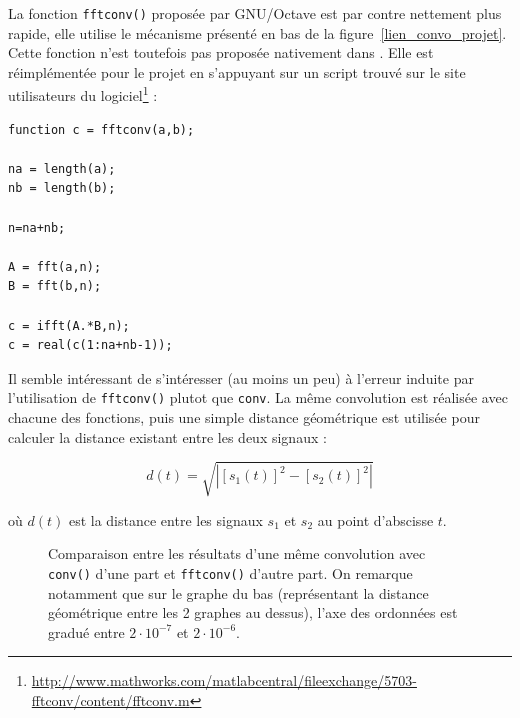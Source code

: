 La fonction \texttt{fftconv()} proposée par GNU/Octave est par contre nettement plus rapide, elle utilise le mécanisme
présenté en bas de la figure~\ref{lien_convo_projet}. Cette fonction n'est toutefois pas proposée nativement dans
\matlab. Elle est réimplémentée pour le projet en s'appuyant sur un script trouvé sur le site utilisateurs du
logiciel\footnote{\url{http://www.mathworks.com/matlabcentral/fileexchange/5703-fftconv/content/fftconv.m}} :

\begin{Verbatim}[samepage=true]
function c = fftconv(a,b);

na = length(a);
nb = length(b);

n=na+nb;

A = fft(a,n);
B = fft(b,n);

c = ifft(A.*B,n);
c = real(c(1:na+nb-1));
\end{Verbatim}

Il semble intéressant de s'intéresser (au moins un peu) à l'erreur induite par l'utilisation de \texttt{fftconv()}
plutot que \texttt{conv}. La même convolution est réalisée avec chacune des fonctions, puis une simple distance
géométrique est utilisée pour calculer la distance existant entre les deux signaux : 

$$ d(t) = \sqrt{\left|\left[s_1(t)\right]^2 - \left[s_2(t)\right]^2\right|}$$

où $d(t)$ est la distance entre les signaux $s_1$ et $s_2$ au point d'abscisse $t$.

\begin{figure}[h!]
\caption{\label{comp_conv_fftconv}Comparaison entre les résultats d'une même convolution avec \texttt{conv()} d'une part
et \texttt{fftconv()} d'autre part. On remarque notamment que sur le graphe du bas (représentant la distance géométrique
entre les 2 graphes au dessus), l'axe des ordonnées est gradué entre $2\cdot10^{-7}$ et $2\cdot10^{-6}$.}
\end{figure}

